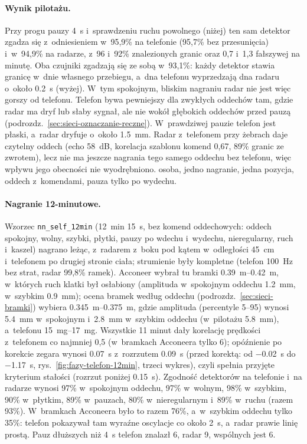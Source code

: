 \documentclass[12pt,a4paper,oneside]{report}
\begin{document}
\paragraph{Wynik pilotażu.} Przy progu pauzy \SI{4}{s} i~sprawdzeniu ruchu powolnego (niżej) ten sam
detektor zgadza się z~odniesieniem w~95,9\% na telefonie (95,7\% bez przesunięcia) i~w~94,9\%
na radarze, z~96 i~92\% znalezionych granic oraz 0,7 i~1,3 fałszywej na minutę. Oba czujniki
zgadzają się ze sobą w~93,1\%: każdy detektor stawia granicę w~dnie własnego przebiegu, a~dna
telefonu wyprzedzają dna radaru o~około \SI{0.2}{s} (wyżej). W~tym spokojnym, bliskim nagraniu radar nie
jest więc gorszy od telefonu. Telefon bywa pewniejszy dla zwykłych
oddechów tam, gdzie radar ma dryf lub słaby sygnał, ale nie wokół głębokich oddechów przed pauzą
(podrozdz.~\ref{sec:sieci-oznaczanie-reczne}).
W~prawdziwej pauzie telefon jest płaski, a~radar dryfuje o~około \SI{1.5}{mm}. Radar z~telefonem
przy żebrach daje czytelny oddech (echo \SI{58}{dB}, korelacja szablonu komend
0,67, 89\% granic ze zwrotem), lecz nie ma jeszcze nagrania tego samego oddechu
bez telefonu, więc wpływu jego obecności nie wyodrębniono. 
osoba, jedno nagranie, jedna pozycja, oddech z~komendami, pauza tylko po wydechu.

\paragraph{Nagranie 12-minutowe.} Wzorzec \texttt{nn\_self\_12min} (\SI{12}{min}
\SI{15}{s}, bez komend oddechowych: oddech spokojny, wolny, szybki, płytki, pauzy
po wdechu i~wydechu, nieregularny, ruch i~kaszel) nagrano leżąc, z~radarem
z~boku pod kątem w~odległości \SI{45}{cm} i~telefonem po drugiej stronie ciała;
strumienie były kompletne (telefon \SI{100}{Hz} bez strat, radar 99,8\% ramek).
Acconeer wybrał tu bramki \SIrange{0.39}{0.42}{m}, w~których ruch klatki
był osłabiony (amplituda w~spokojnym oddechu \SI{1.2}{mm}, w~szybkim
\SI{0.9}{mm}); ocena bramek według oddechu (podrozdz.~\ref{sec:sieci-bramki})
wybiera \SIrange{0.345}{0.375}{m}, gdzie amplituda (percentyle 5--95) wynosi
\SI{5.4}{mm} w~spokojnym i~\SI{2.8}{mm} w~szybkim oddechu (w~pilotażu
\SI{5.8}{mm}), a~telefonu \SI{15}{mg}--\SI{17}{mg}. Wszystkie 11 minut dały
korelację prędkości z~telefonem co najmniej 0,5 (w~bramkach Acconeera tylko 6);
opóźnienie po korekcie zegara wynosi \SI{0.07}{s} z~rozrzutem \SI{0.09}{s}
(przed korektą: od \SI{-0.02}{s} do \SI{-1.17}{s}, rys.~\ref{fig:fazy-telefon-12min},
trzeci wykres), czyli spełnia przyjęte kryterium stałości (rozrzut poniżej
\SI{0.15}{s}). Zgodność detektorów na telefonie i~na radarze wynosi 97\%
w~spokojnym oddechu, 97\% w~wolnym, 98\% w~szybkim, 90\% w~płytkim, 89\%
w~pauzach, 80\% w~nieregularnym i~89\% w~ruchu (razem 93\%). W~bramkach
Acconeera było to razem 76\%, a~w~szybkim oddechu tylko 35\%: telefon
pokazywał tam wyraźne oscylacje co około \SI{2}{s}, a~radar prawie linię
prostą. Pauz dłuższych niż \SI{4}{s} telefon znalazł 6, radar 9, wspólnych
jest 6.
\end{document}
